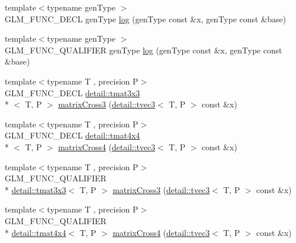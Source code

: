 \begin{DoxyCompactItemize}
\item 
{\footnotesize template$<$typename gen\-Type $>$ }\\G\-L\-M\-\_\-\-F\-U\-N\-C\-\_\-\-D\-E\-C\-L gen\-Type \hyperlink{group__gtx__log__base_ga60a7b0a401da660869946b2b77c710c9}{log} (gen\-Type const \&x, gen\-Type const \&base)
\item 
{\footnotesize template$<$typename gen\-Type $>$ }\\G\-L\-M\-\_\-\-F\-U\-N\-C\-\_\-\-Q\-U\-A\-L\-I\-F\-I\-E\-R gen\-Type \hyperlink{group__gtx__log__base_ga60a7b0a401da660869946b2b77c710c9}{log} (gen\-Type const \&x, gen\-Type const \&base)
\item 
{\footnotesize template$<$typename T , precision P$>$ }\\G\-L\-M\-\_\-\-F\-U\-N\-C\-\_\-\-D\-E\-C\-L \hyperlink{structglm_1_1detail_1_1tmat3x3}{detail\-::tmat3x3}\\*
$<$ T, P $>$ \hyperlink{group__gtx__matrix__cross__product_gaebbd4b4436b55c14b6d0b973167a25e4}{matrix\-Cross3} (\hyperlink{structglm_1_1detail_1_1tvec3}{detail\-::tvec3}$<$ T, P $>$ const \&x)
\item 
{\footnotesize template$<$typename T , precision P$>$ }\\G\-L\-M\-\_\-\-F\-U\-N\-C\-\_\-\-D\-E\-C\-L \hyperlink{structglm_1_1detail_1_1tmat4x4}{detail\-::tmat4x4}\\*
$<$ T, P $>$ \hyperlink{group__gtx__matrix__cross__product_gab3c272adc9c9fc1f7c26d6f353b4bb4b}{matrix\-Cross4} (\hyperlink{structglm_1_1detail_1_1tvec3}{detail\-::tvec3}$<$ T, P $>$ const \&x)
\item 
{\footnotesize template$<$typename T , precision P$>$ }\\G\-L\-M\-\_\-\-F\-U\-N\-C\-\_\-\-Q\-U\-A\-L\-I\-F\-I\-E\-R \\*
\hyperlink{structglm_1_1detail_1_1tmat3x3}{detail\-::tmat3x3}$<$ T, P $>$ \hyperlink{group__gtx__matrix__cross__product_gaebbd4b4436b55c14b6d0b973167a25e4}{matrix\-Cross3} (\hyperlink{structglm_1_1detail_1_1tvec3}{detail\-::tvec3}$<$ T, P $>$ const \&x)
\item 
{\footnotesize template$<$typename T , precision P$>$ }\\G\-L\-M\-\_\-\-F\-U\-N\-C\-\_\-\-Q\-U\-A\-L\-I\-F\-I\-E\-R \\*
\hyperlink{structglm_1_1detail_1_1tmat4x4}{detail\-::tmat4x4}$<$ T, P $>$ \hyperlink{group__gtx__matrix__cross__product_gab3c272adc9c9fc1f7c26d6f353b4bb4b}{matrix\-Cross4} (\hyperlink{structglm_1_1detail_1_1tvec3}{detail\-::tvec3}$<$ T, P $>$ const \&x)

\end{DoxyCompactItemize}
